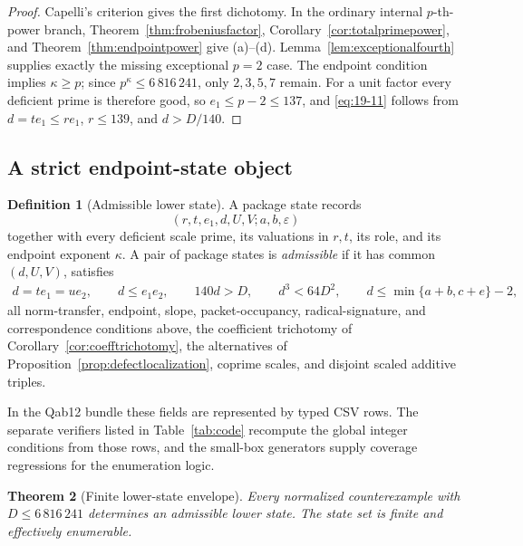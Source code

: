 \documentclass[11pt]{article}
\numberwithin{equation}{section}
\newtheorem{theorem}{Theorem}[section]
\theoremstyle{definition}
\newtheorem{definition}[theorem]{Definition}
\begin{document}
\begin{proof}
Capelli's criterion gives the first dichotomy.  In the ordinary internal
\(p\)-th-power branch, Theorem~\ref{thm:frobeniusfactor},
Corollary~\ref{cor:totalprimepower}, and Theorem~\ref{thm:endpointpower}
give (a)--(d).  Lemma~\ref{lem:exceptionalfourth} supplies exactly the
missing exceptional \(p=2\) case.  The endpoint condition implies
\(\kappa\geq p\); since \(p^\kappa\leq6\,816\,241\), only
\(2,3,5,7\) remain.  For a unit factor every deficient prime is therefore
good, so \(e_1\leq p-2\leq137\), and \eqref{eq:19-11} follows from
\(d=te_1\leq re_1\), \(r\leq139\), and \(d>D/140\).
\end{proof}

\subsection{A strict endpoint-state object}

\begin{definition}[Admissible lower state]\label{def:endpointstate}
A package state records
\[
 (r,t,e_1,d,U,V;a,b,\varepsilon)
\]
together with every deficient scale prime, its valuations in \(r,t\), its
role, and its endpoint exponent \(\kappa\).  A pair of package states is
\emph{admissible} if it has common \((d,U,V)\), satisfies
\begin{gather}
 d=te_1=ue_2,\qquad d\leq e_1e_2,
 \qquad 140d>D,
 \qquad d^3<64D^2,
 \qquad d\leq\min\{a+b,c+e\}-2,\label{eq:19-12}
\end{gather}
all norm-transfer, endpoint, slope, packet-occupancy, radical-signature, and
correspondence conditions above, the coefficient trichotomy of
Corollary~\ref{cor:coefftrichotomy}, the alternatives of
Proposition~\ref{prop:defectlocalization}, coprime scales, and disjoint scaled
additive triples.
\end{definition}

In the Qab12 bundle these fields are represented by typed CSV rows.  The
separate verifiers listed in Table~\ref{tab:code} recompute the global integer
conditions from those rows, and the small-box generators supply coverage
regressions for the enumeration logic.

\begin{theorem}[Finite lower-state envelope]\label{thm:lowerstatereduction}
Every normalized counterexample with \(D\leq6\,816\,241\) determines an
admissible lower state.  The state set is finite and effectively enumerable.
\end{theorem}
\end{document}
